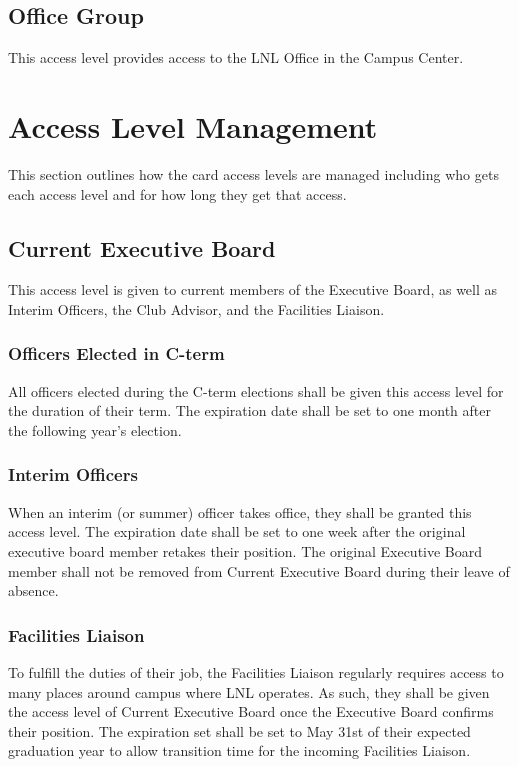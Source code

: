 \documentclass[12pt,letterpaper]{book}
\begin{document}
\subsection{Office Group}
This access level provides access to the LNL Office in the Campus Center.

\section{Access Level Management}
This section outlines how the card access levels are managed including who gets each access level and for how long they get that access.

\subsection{Current Executive Board}
This access level is given to current members of the Executive Board, as well as Interim Officers, the Club Advisor, and the Facilities Liaison.

\subsubsection{Officers Elected in C-term}
All officers elected during the C-term elections shall be given this access level for the duration of their term. The expiration date shall be set to one month after the following year's election.

\subsubsection{Interim Officers}
When an interim (or summer) officer takes office, they shall be granted this access level. The expiration date shall be set to one week after the original executive board member retakes their position. The original Executive Board member shall not be removed from Current Executive Board during their leave of absence.

\subsubsection{Facilities Liaison}
To fulfill the duties of their job, the Facilities Liaison regularly requires access to many places around campus where LNL operates. As such, they shall be given the access level of Current Executive Board once the Executive Board confirms their position. The expiration set shall be set to May 31st of their expected graduation year to allow transition time for the incoming Facilities Liaison.
\end{document}
